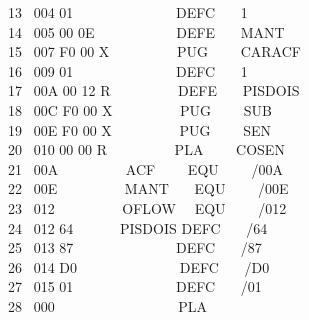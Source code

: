 \documentclass[a4paper,12pt]{article}
\begin{document}
\phantom \ \ 13 \ 004 01 \ \ \ \ \ \ \ \ \ \ \ \ \ \ DEFC \ \ \ 1\\
\phantom \ \ 14 \ 005 00 0E \ \ \ \ \ \ \ \ \ \ \ DEFE \ \ \ MANT\\
\phantom \ \ 15 \ 007 F0 00 X \ \ \ \ \ \ \ \ \ PUG \ \ \ \ CARACF\\
\phantom \ \ 16 \ 009 01 \ \ \ \ \ \ \ \ \ \ \ \ \ \ DEFC \ \ \ 1\\
\phantom \ \ 17 \ 00A 00 12 R \ \ \ \ \ \ \ \ \ DEFE \ \ \ PISDOIS\\
\phantom \ \ 18 \ 00C F0 00 X \ \ \ \ \ \ \ \ \ PUG \ \ \ \ SUB\\
\phantom \ \ 19 \ 00E F0 00 X \ \ \ \ \ \ \ \ \ PUG \ \ \ \ SEN\\
\phantom \ \ 20 \ 010 00 00 R \ \ \ \ \ \ \ \ \ PLA \ \ \ \ COSEN\\
\phantom \ \ 21 \ 00A \ \ \ \ \ \ \ \ \ ACF \ \ \ \ EQU \ \ \ \ /00A\\
\phantom \ \ 22 \ 00E \ \ \ \ \ \ \ \ \ MANT \ \ \ EQU \ \ \ \ /00E\\
\phantom \ \ 23 \ 012 \ \ \ \ \ \ \ \ \ OFLOW \ \ EQU \ \ \ \ /012\\
\phantom \ \ 24 \ 012 64 \ \ \ \ \ \ PISDOIS DEFC \ \ \ /64\\
\phantom \ \ 25 \ 013 87 \ \ \ \ \ \ \ \ \ \ \ \ \ \ DEFC \ \ \ /87\\
\phantom \ \ 26 \ 014 D0 \ \ \ \ \ \ \ \ \ \ \ \ \ \ DEFC \ \ \ /D0\\
\phantom \ \ 27 \ 015 01 \ \ \ \ \ \ \ \ \ \ \ \ \ \ DEFC \ \ \ /01\\
\phantom \ \ 28 \ 000 \ \ \ \ \ \ \ \ \ \ \ \ \ \ \ \ \ PLA

\newpage

\noindent \\[6em]
\end{document}
